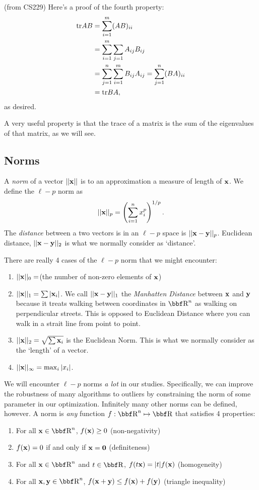 \documentclass{article}
\begin{document}
(from CS229) Here's a proof of the fourth property:
\begin{align*}
    {\hbox{tr}} AB &= \sum_{i=1}^m(AB)_{ii}\\
    &= \sum_{i=1}^m\sum_{j=1} A_{ij}B_{ij}\\
    &= \sum_{j=1}^n\sum_{i=1}^m B_{ij}A_{ij} = \sum_{j=1}^n (BA)_{ii}\\
    &= {\hbox{tr}} BA,
\end{align*}
as desired.

A very useful property is that the trace of a matrix is the sum
of the eigenvalues of that matrix, as we will see.

\subsection{Norms}

A \textit{norm} of a vector $||{\bf x}||$ is to an approximation a measure of
length of ${\bf x}$. We define the $\ell-p$ norm as
\[
    ||{\bf x}||_p = \left( \sum_{i=1}^n x_i^p \right)^{1/p}.
\]
The \textit{distance} between a two vectors is in an $\ell-p$ space
is $||{\bf x}-{\bf y}||_p$. Euclidean distance, $||{\bf x}-{\bf y}||_2$ is what we normally
consider as `distance'.

There are really 4 cases of the $\ell-p$ norm that we might encounter:
\begin{enumerate}[-]
    \item $||{\bf x}||_0 = $(the number of non-zero elements of ${\bf x}$)
    \item $||{\bf x}||_1 = \sum |{\bf x}_i|$. We call $||{\bf x}-{\bf y}||_1$ the \textit{Manhatten Distance}
        between ${\bf x}$ and ${\bf y}$ because it treats walking between coordinates in
        $\RR^n$ as walking on perpendicular streets. This is opposed to Euclidean Distance
        where you can walk in a strait line from point to point.
    \item $||{\bf x}||_2 = \sqrt{\sum{\bf x}_i}$ is the Euclidean Norm. This is what we normally
        consider as the `length' of a vector.
    \item $||{\bf x}||_\infty = \max_i |x_i|$.
\end{enumerate}
We will encounter $\ell-p$ norms \textit{a lot} in our studies. Specifically, we can
improve the robustness of many algorithms to outliers by constraining the norm
of some parameter in our optimization. Infinitely many other norms can be defined,
however. A norm is \textit{any} function $f : \RR^n \mapsto \RR$ that satisfies 4
properties:
\begin{enumerate}
\item For all $\xx\in\RR^n$, $f({\bf x})\geq 0$ \hfill (non-negativity)
\item $f({\bf x})=0$ if and only if ${\bf x}={\bf 0}$ \hfill (definiteness)
\item For all $\xx\in\RR^n$ and $t\in\RR$, $f(t{\bf x}) = |t|f({\bf x})$ \hfill (homogeneity)
\item For all $\xx,\yy\in\RR^n$, $f({\bf x}+{\bf y}) \leq f({\bf x}) + f({\bf y})$ \hfill (triangle inequality)\\
\end{enumerate}
\end{document}
